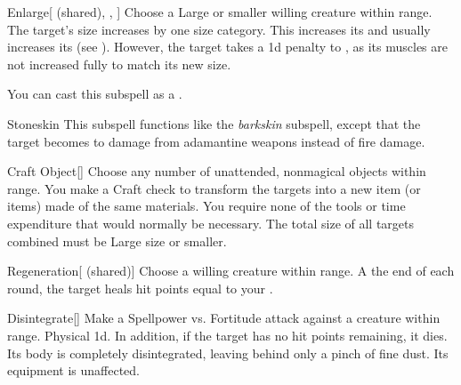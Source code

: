 \begin{ability}[\nth{3}]{Enlarge}[ (shared), , ]
Choose a Large or smaller willing creature within \rngclose range.
The target's size increases by one size category.
This increases its  and usually increases its  (see ).
However, the target takes a \minus1d penalty to , as its muscles are not increased fully to match its new size.

You can cast this subspell as a .
\end{ability}
\vspace{0.25em}


\begin{ability}[\nth{3}]{Stoneskin}
This subspell functions like the \textit{barkskin} subspell, except that the target becomes  to damage from adamantine weapons instead of fire damage.
\end{ability}
\vspace{0.25em}


\begin{ability}[\nth{4}]{Craft Object}[]
Choose any number of unattended, nonmagical objects within \rngclose range.
You make a Craft check to transform the targets into a new item (or items) made of the same materials.
You require none of the tools or time expenditure that would normally be necessary.
The total size of all targets combined must be Large size or smaller.
\end{ability}
\vspace{0.25em}


\begin{ability}[\nth{4}]{Regeneration}[ (shared)]
Choose a willing creature within \rngclose range.
A the end of each round, the target heals hit points equal to your .
\end{ability}
\vspace{0.25em}


\begin{ability}[\nth{6}]{Disintegrate}[]
Make a Spellpower vs. Fortitude attack against a creature within \rngmed range.
\hit Physical  \plus1d.
In addition, if the target has no hit points remaining, it dies.
Its body is completely disintegrated, leaving behind only a pinch of fine dust.
Its equipment is unaffected.
\end{ability}
\vspace{0.25em}


